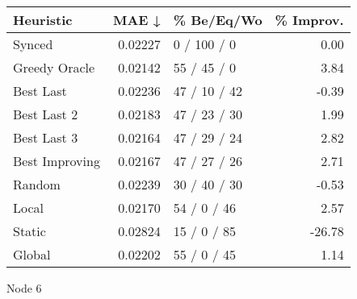 \begin{tabular}{lrlr}
\toprule
\textbf{Heuristic} & \textbf{MAE ↓} & \textbf{\% Be/Eq/Wo} & \textbf{\% Improv.} \\
\midrule
            Synced &        0.02227 &          0 / 100 / 0 &                0.00 \\
     Greedy Oracle &        0.02142 &          55 / 45 / 0 &                3.84 \\
         Best Last &        0.02236 &         47 / 10 / 42 &               -0.39 \\
       Best Last 2 &        0.02183 &         47 / 23 / 30 &                1.99 \\
       Best Last 3 &        0.02164 &         47 / 29 / 24 &                2.82 \\
    Best Improving &        0.02167 &         47 / 27 / 26 &                2.71 \\
            Random &        0.02239 &         30 / 40 / 30 &               -0.53 \\
             Local &        0.02170 &          54 / 0 / 46 &                2.57 \\
            Static &        0.02824 &          15 / 0 / 85 &              -26.78 \\
            Global &        0.02202 &          55 / 0 / 45 &                1.14 \\
\bottomrule
\end{tabular}
\caption{Node 6}
\label{tab:iid_lr01_le2_bs2_6}
